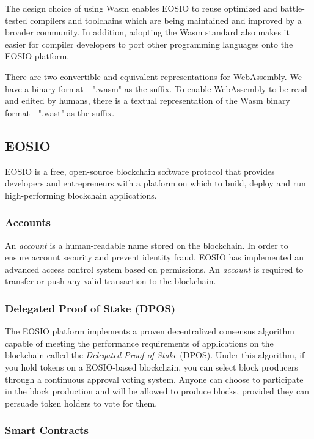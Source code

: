 \documentclass[a4paper, 10pt, conference, twocolumn]{ieeeconf}       %
\begin{document}
The design choice of using Wasm enables EOSIO to reuse optimized and battle-tested compilers and toolchains which are being maintained and improved by a broader community.
In addition, adopting the Wasm standard also makes it easier for compiler developers to port other programming languages onto the EOSIO platform.

There are two convertible and equivalent representations for WebAssembly.
We have a binary format - ".wasm" as the suffix.
To enable WebAssembly to be read and edited by humans, there is a textual representation of the Wasm binary format - ".wast" as the suffix.

\subsection{EOSIO}

EOSIO is a free, open-source blockchain software protocol that provides developers and entrepreneurs with a platform on which to build, deploy and run high-performing blockchain applications.

\subsubsection{Accounts}

An \emph{account} is a human-readable name stored on the blockchain\cite{eosio}.
In order to ensure account security and prevent identity fraud, EOSIO has implemented an advanced access control system based on permissions.
An \emph{account} is required to transfer or push any valid transaction to the blockchain.

\subsubsection{Delegated Proof of Stake (DPOS)}

The EOSIO platform implements a proven decentralized consensus algorithm capable of meeting the performance requirements of applications on the blockchain called the \emph{Delegated Proof of Stake} (DPOS).
Under this algorithm, if you hold tokens on a EOSIO-based blockchain, you can select block producers through a continuous approval voting system.
Anyone can choose to participate in the block production and will be allowed to produce blocks, provided they can persuade token holders to vote for them\cite{eosio}.

\subsubsection{Smart Contracts}\label{2.2.3}
\end{document}
